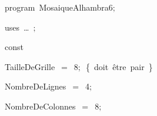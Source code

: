 
{
\parindent {}
\medskip

\carrenoir
\vspace{\neglskip}\mbox{\blc  \idt  \mcl program\idt\ MosaiqueAlhambra6$;$
}\par 
\vspace{\neglskip}\mbox{\blc \blk\idt \mcl uses\idt \ \ldots\ $;$
}\par 
\medskip

\pagebreak[3] 
\vspace{\neglskip}\mbox{\blc  \blk\idt  \mcl const\idt \ }\par 
\vspace{\neglskip}\mbox{\blc  \blk\blk\idt  TailleDeGrille\ $=$\ 8$;$\ \cmt  \{\ doit\ être\ pair\ \}\idt }\par 
\vspace{\neglskip}\mbox{\blc  \blk\blk\idt  NombreDeLignes\ $=$\ 4$;$}\par 
\vspace{\neglskip}\mbox{\blc  \blk\blk\idt  NombreDeColonnes\ $=$\ 8$;$}\par 
\medskip

}
